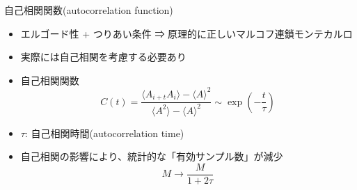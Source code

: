\begin{frame}[t,fragile]{自己相関関数(autocorrelation function)}
  \begin{itemize}
    \setlength{\itemsep}{1em}
  \item エルゴード性 + つりあい条件 ⇒ 原理的に正しいマルコフ連鎖モンテカルロ
  \item 実際には自己相関を考慮する必要あり
  \item 自己相関関数
    \[
    C(t) = \frac{\langle A_{i+t}A_i \rangle - \langle A \rangle^2}{\langle A^2 \rangle - \langle A \rangle^2} \sim \exp(-\frac{t}{\tau})
    \]
  \item $\tau$: 自己相関時間(autocorrelation time)
  \item 自己相関の影響により、統計的な「有効サンプル数」が減少
    \[
    M \rightarrow \frac{M}{1+2\tau}
    \]
  \end{itemize}
\end{frame}
